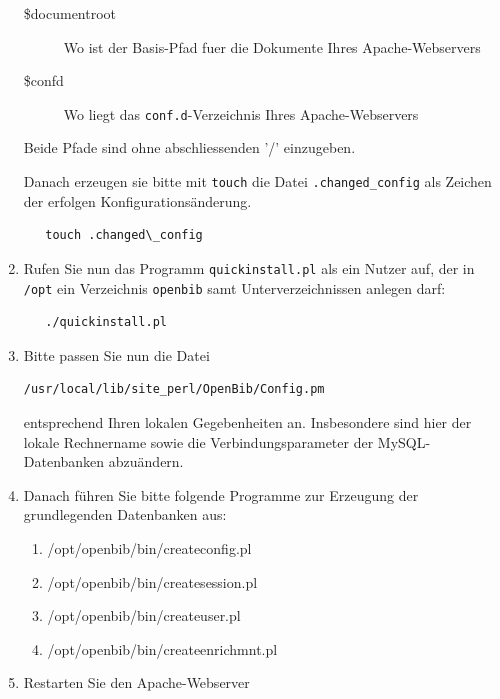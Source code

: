 \documentclass[11pt, twoside, a4paper, BCOR8mm, DIV12, bibtotoc,idxtotoc]{scrbook}
\begin{document}
\begin{enumerate}
   \begin{description}
   \item[\$documentroot] Wo ist der Basis-Pfad fuer die Dokumente
     Ihres Apache-Webservers
   \item[\$confd] Wo liegt das \texttt{conf.d}-Verzeichnis Ihres
     Apache-Webservers
   \end{description}

   Beide Pfade sind ohne abschliessenden '/' einzugeben.

   Danach erzeugen sie bitte mit \texttt{touch} die Datei
   \texttt{.changed\_config} als Zeichen der erfolgen
   Konfigurationsänderung.

   \begin{verbatim}
   touch .changed\_config
   \end{verbatim}

 \item Rufen Sie nun das Programm \texttt{quickinstall.pl} als ein
   Nutzer auf, der in \texttt{/opt} ein Verzeichnis \texttt{openbib} samt
   Unterverzeichnissen anlegen darf:

   \begin{verbatim}
   ./quickinstall.pl
   \end{verbatim}
\item Bitte passen Sie nun die Datei

\begin{verbatim}
/usr/local/lib/site_perl/OpenBib/Config.pm
\end{verbatim}

   entsprechend Ihren lokalen Gegebenheiten an. Insbesondere sind hier
   der lokale Rechnername sowie die Verbindungsparameter der
   MySQL-Datenbanken abzuändern.

\item Danach führen Sie bitte folgende Programme zur Erzeugung der
   grundlegenden Datenbanken aus:

\begin{enumerate}
   \item /opt/openbib/bin/createconfig.pl
   \item /opt/openbib/bin/createsession.pl
   \item /opt/openbib/bin/createuser.pl
   \item /opt/openbib/bin/createenrichmnt.pl
\end{enumerate}

\item Restarten Sie den Apache-Webserver


\end{enumerate}
\end{document}

